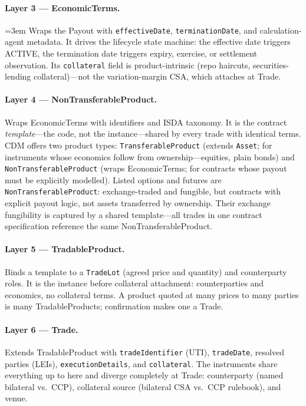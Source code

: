 \documentclass[11pt,a4paper]{article}
\begin{document}
\paragraph{Layer 3 --- EconomicTerms.} {\emergencystretch=3em Wraps the Payout with \texttt{effective\allowbreak Date}, \texttt{termination\allowbreak Date}, and calculation-agent metadata. It drives the lifecycle state machine: the effective date triggers ACTIVE, the termination date triggers expiry, exercise, or settlement observation. Its \texttt{collateral} field is product-intrinsic (repo haircuts, securities-lending collateral)---\allowbreak not the variation-margin CSA, which attaches at Trade.\par}

\paragraph{Layer 4 --- NonTransferableProduct.} Wraps EconomicTerms with identifiers and ISDA taxonomy. It is the contract \emph{template}---the code, not the instance---shared by every trade with identical terms. CDM offers two product types: \texttt{Transferable\allowbreak Product} (extends \texttt{Asset}; for instruments whose economics follow from ownership---equities, plain bonds) and \texttt{Non\allowbreak Transferable\allowbreak Product} (wraps EconomicTerms; for contracts whose payout must be explicitly modelled). Listed options and futures are \texttt{Non\allowbreak Transferable\allowbreak Product}: exchange-traded and fungible, but contracts with explicit payout logic, not assets transferred by ownership. Their exchange fungibility is captured by a shared template---all trades in one contract specification reference the same NonTransferableProduct.

\paragraph{Layer 5 --- TradableProduct.} Binds a template to a \texttt{TradeLot} (agreed price and quantity) and counterparty roles. It is the instance before collateral attachment: counterparties and economics, no collateral terms. A product quoted at many prices to many parties is many TradableProducts; confirmation makes one a Trade.

\paragraph{Layer 6 --- Trade.} Extends TradableProduct with \texttt{tradeIdentifier} (UTI), \texttt{tradeDate}, resolved parties (LEIs), \texttt{executionDetails}, and \texttt{collateral}. The instruments share everything up to here and diverge completely at Trade: counterparty (named bilateral vs.\ CCP), collateral source (bilateral CSA vs.\ CCP rulebook), and venue.
\end{document}
